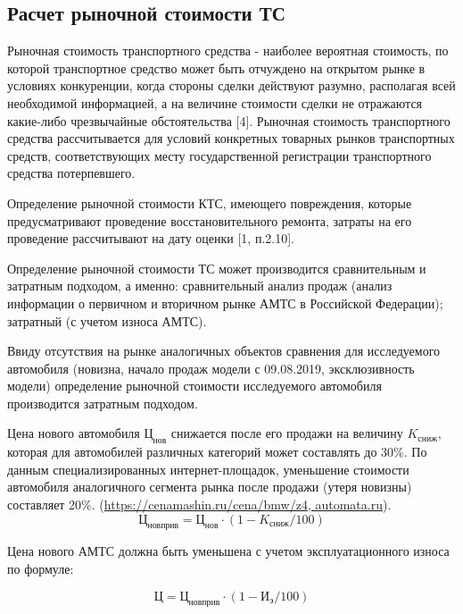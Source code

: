 \subsection{Расчет рыночной стоимости ТС}


\par \indent Рыночная стоимость транспортного средства - наиболее вероятная стоимость, по которой транспортное средство может быть отчуждено на открытом рынке в условиях конкуренции, когда стороны сделки действуют разумно, располагая всей необходимой информацией, а на величине стоимости сделки не отражаются какие-либо чрезвычайные обстоятельства [4]. Рыночная стоимость транспортного средства  рассчитывается  для условий конкретных товарных рынков транспортных средств, соответствующих месту государственной регистрации транспортного средства потерпевшего.
\par Определение рыночной стоимости КТС, имеющего повреждения, которые предусматривают проведение восстановительного ремонта, затраты на его проведение рассчитывают на дату оценки [1, п.2.10].
\par Определение рыночной стоимости ТС может производится сравнительным и затратным подходом, а именно:  сравнительный анализ продаж (анализ информации о первичном и вторичном рынке АМТС в Российской Федерации);  затратный (с учетом износа АМТС).
\par Ввиду отсутствия на рынке аналогичных объектов сравнения для исследуемого автомобиля (новизна, начало продаж модели с 09.08.2019, эксклюзивность модели) определение рыночной стоимости исследуемого автомобиля производится затратным подходом.

\par Цена нового автомобиля  $  \text{Ц}_\text{нов} $ снижается после его продажи на величину $ K_\text{сниж} $, которая для автомобилей различных категорий может составлять до 30\%. По данным специализированных интернет-площадок, уменьшение стоимости автомобиля аналогичного сегмента рынка после продажи (утеря новизны) составляет 20\%. (\url{https://cenamashin.ru/cena/bmw/z4, automata.ru}).
\begin{equation}\label{f:r}
\text{Ц}_\text{новприв} = \text{Ц}_\text{нов} \cdot (1-K_\text{сниж}/100)
\end{equation}

Цена нового АМТС   должна быть уменьшена с учетом эксплуатационного износа   по формуле:

\begin{equation}\label{f:n}
\text{Ц} = \text{Ц}_\text{новприв} \cdot (1-\text{И}_\text{э}/100)
\end{equation}

